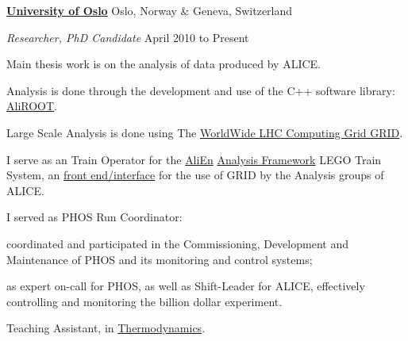 \documentclass[11pt]{article}
\newenvironment{outerlist}[1][\enskip\textbullet]%
        {\begin{itemize}[#1]}{\end{itemize}%
         \vspace{-.6\baselineskip}}
\newenvironment{innerlist}[1][\enskip\textbullet]%
        {\begin{compactitem}[#1]}{\end{compactitem}}
\newcommand{\blankline}{\quad\pagebreak[2]}
\begin{document}
\href{http://www.uib.no/en}{\textbf{University of Oslo}}
Oslo, Norway \& Geneva, Switzerland
\begin{outerlist}
\item[] \textit{Researcher, PhD Candidate}
  \hfill April 2010 to Present
  \begin{innerlist}
    \footnotesize
  \item Main thesis work is on the analysis of data produced by ALICE.
    \begin{innerlist}
    \item Analysis is done through the development and use of the 
      C++ software library: 
      \href{http://aliweb.cern.ch/Offline/AliRoot/Manual.html}{AliROOT}.
    \item Large Scale Analysis is done using The 
      \href{http://wlcg.web.cern.ch/}{WorldWide LHC Computing Grid GRID}.
    \item I serve as an Train Operator for the \href{alien2.cern.ch}{AliEn} 
      \href{http://aliweb.cern.ch/Offline/Activities/Analysis/AnalysisFramework/index.html}{Analysis Framework} LEGO Train System, an 
      \href{http://alimonitor.cern.ch/map.jsp}{front end/interface} 
      for the use of GRID by the Analysis groups of ALICE.
    \end{innerlist}
  \item I served as PHOS Run Coordinator:
    \begin{innerlist}
    \item coordinated and participated in the Commissioning, 
      Development and Maintenance of PHOS and its monitoring and control systems;
    \item as expert on-call for PHOS, as well as Shift-Leader for ALICE, 
      effectively controlling and monitoring the billion dollar experiment.
    \end{innerlist}
  \item Teaching Assistant, in \href{http://www.uio.no/studier/emner/matnat/fys/FYS2160/index-eng.html}{Thermodynamics}.
  \end{innerlist}
\end{outerlist}

\blankline
\end{document}

